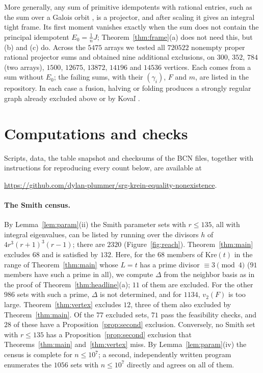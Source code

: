 \documentclass[11pt]{article}
\theoremstyle{definition}
\theoremstyle{remark}
\newcommand{\Kre}{\mathrm{Kre}}
\begin{document}
More generally, any sum of primitive idempotents with rational entries, such as
the sum over a Galois orbit \cite{LM}, is a projector, and after scaling it
gives an integral tight frame. Its first moment vanishes exactly when the sum
does not contain the principal idempotent $E_0=\frac1nJ$; Theorem~\ref{thm:frame}(a)
does not need this, but (b) and (c) do. Across the $5475$ arrays we tested all $720522$
nonempty proper rational projector sums and obtained nine additional
exclusions, on $300$, $352$, $784$ (two arrays), $1500$, $12675$, $13872$,
$14196$ and $14536$ vertices. Each comes from a sum without $E_0$; the failing
sums, with their $(\gamma_i)$, $F$ and $m$, are listed in the repository. In each case a
fusion, halving or folding produces a strongly regular graph already excluded
above or by Kova\v l \cite{Koval}.

\section{Computations and checks}\label{sec:checks}

Scripts, data, the table snapshot and checksums of the BCN files, together
with instructions for reproducing every count below, are available at
\begin{center}\url{https://github.com/dylan-plummer/srg-krein-equality-nonexistence}.\end{center}

\paragraph{The Smith census.}
By Lemma~\ref{lem:param}(ii) the Smith parameter sets with $r\le135$, all with
integral eigenvalues, can be listed by running over the divisors $h$ of
$4r^3(r+1)^3(r-1)$; there are $2320$ (Figure~\ref{fig:reach}).
Theorem~\ref{thm:main} excludes $68$ and is satisfied by $132$. Here, for the
$68$ members of $\Kre(t)$ in the range of Theorem~\ref{thm:main} whose $L=t$
has a prime divisor $\equiv3\pmod4$ ($91$ members have such a prime in all),
we compute $\Delta$ from the neighbor basis as in the proof of
Theorem~\ref{thm:headline}(a); $11$ of them are excluded. For the other $986$
sets with such a prime, $\Delta$ is not determined, and for $1134$, $v_2(F)$ is
too large.
Theorem~\ref{thm:vertex} excludes $12$, three of them also excluded by
Theorem~\ref{thm:main}. Of the $77$ excluded sets, $71$ pass the feasibility
checks, and $28$ of these have a Proposition~\ref{prop:second} exclusion.
Conversely, no Smith set with $r\le135$ has a Proposition~\ref{prop:second}
exclusion that Theorems~\ref{thm:main} and~\ref{thm:vertex} miss. By
Lemma~\ref{lem:param}(iv) the census is complete for $n\le10^7$; a second,
independently written program enumerates the $1056$ sets with $n\le10^7$
directly and agrees on all of them.
\end{document}
